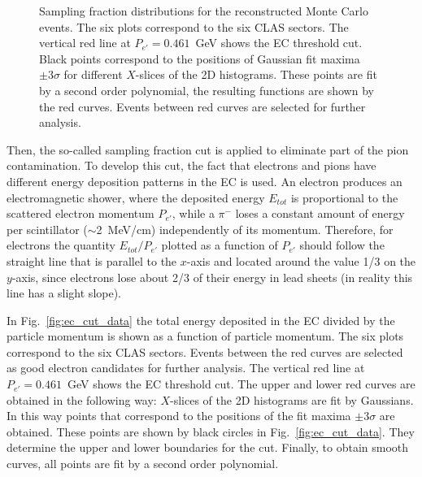 \begin{figure}[htp]
\begin{center}
\caption{\small  Sampling fraction distributions for the reconstructed Monte Carlo events. The six plots correspond to the six CLAS sectors. The vertical red line at $P_{e'} = 0.461$~GeV shows the EC threshold cut. Black points correspond to the positions of Gaussian fit maxima $\pm 3\sigma$ for different $X$-slices of the 2D histograms. These points are fit by a second order polynomial, the resulting functions are shown by the red curves. Events between red curves are selected for further analysis.} \label{fig:ec_cut_sim}
\end{center}
\end{figure}


Then, the so-called sampling fraction cut is applied to eliminate part of the pion contamination. To develop this cut, the fact that electrons and pions have different energy deposition patterns in the EC is used. An electron produces an electromagnetic shower, where the deposited energy $E_{tot}$ is proportional to the scattered electron momentum $P_{e'}$, while a $\pi^{-}$ loses a constant amount of energy per scintillator ($\sim$2~MeV/cm) independently of its momentum. Therefore, for electrons the quantity $E_{tot}/P_{e'}$ plotted as a function of $P_{e'}$ should follow the straight line that is parallel to the $x$-axis and located around the value 1/3 on the $y$-axis, since electrons lose about 2/3 of their energy in lead sheets (in reality this line has a slight slope).


In Fig.~\ref{fig:ec_cut_data} the total energy deposited in the EC divided by the particle momentum is shown as a function of particle momentum. The six plots correspond to the six CLAS sectors. Events between the red curves are selected as good electron candidates for further analysis. The vertical red line at $P_{e'} = 0.461$~GeV shows the EC threshold cut. The upper and lower red curves are obtained in the following way:  $X$-slices of the 2D histograms are fit by Gaussians. In this way points that correspond to the positions of the fit maxima $\pm 3\sigma$ are obtained. These points are shown by black circles in Fig.~\ref{fig:ec_cut_data}. They determine the upper and lower boundaries for the cut. Finally, to obtain smooth curves, all points are fit by a second order polynomial.  


